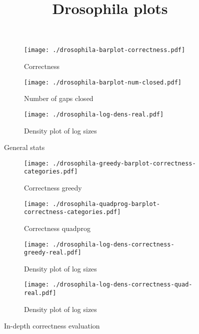 \documentclass[12pt]{amsart}
\begin{document}
\title{Drosophila plots}

\maketitle

\newpage
\begin{figure}[h!]
  \centering

    \begin{subfigure}{230pt}
    \centering
      \texttt{[image: ./drosophila-barplot-correctness.pdf]}
      \caption{Correctness}
    \end{subfigure}%
    \begin{subfigure}{230pt}
      \texttt{[image: ./drosophila-barplot-num-closed.pdf]}
      \caption{Number of gaps closed}
    \end{subfigure}

    \begin{subfigure}{400pt}
      \texttt{[image: ./drosophila-log-dens-real.pdf]}
      \caption{Density plot of log sizes}
    \end{subfigure}    

  \caption{General stats}
\end{figure}

\begin{figure}[h!]
  \centering

    \begin{subfigure}{230pt}
    \centering
      \texttt{[image: ./drosophila-greedy-barplot-correctness-categories.pdf]}
      \caption{Correctness greedy}
    \end{subfigure}%
    \begin{subfigure}{230pt}
      \texttt{[image: ./drosophila-quadprog-barplot-correctness-categories.pdf]}
      \caption{Correctness quadprog}
    \end{subfigure}

    \begin{subfigure}{230pt}
      \texttt{[image: ./drosophila-log-dens-correctness-greedy-real.pdf]}
      \caption{Density plot of log sizes}
    \end{subfigure}%
    \begin{subfigure}{230pt}
      \texttt{[image: ./drosophila-log-dens-correctness-quad-real.pdf]}
      \caption{Density plot of log sizes}
    \end{subfigure}    

  \caption{In-depth correctness evaluation}
\end{figure}
\end{document}

